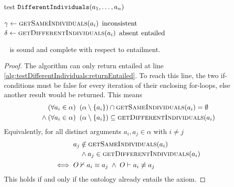 \documentclass[paper.tex]{subfiles}
\begin{document}

\begin{algorithm}[H]
  \caption{test $\mathtt{DifferentIndividuals}(a_1, \ldots, a_n)$}
  \begin{algorithmic}[1]
    \raggedright
        \State $\gamma \gets \Call{getSameIndividuals}{a_i}$
          \State \Return $\mathrm{inconsistent}$
          \label{alg:testDifferentIndividuals:returnInconsistent}
        \EndIf
      \EndFor
        \State $\delta \gets \Call{getDifferentIndividuals}{a_i}$
          \State \Return $\mathrm{absent}$
        \EndIf
      \EndFor
      \State \Return $\mathrm{entailed}$
      \label{alg:testDifferentIndividuals:returnEntailed}
    \EndFunction
  \end{algorithmic}
\end{algorithm}

\begin{proposition}
  \sloppy~
   is sound and complete with respect to entailment.
\end{proposition}
\begin{proof}
  The algorithm can only return entailed at line \ref{alg:testDifferentIndividuals:returnEntailed}.  To reach this line, the two if-conditions must be false for every iteration of their enclosing for-loops, else another result would be returned.  This means
  \begin{align*}
    & (\forall a_i \in \alpha) \;\; (\alpha \setminus \{a_i\}) \intersect \Call{getSameIndividuals}{a_i} = \emptyset \\
    {}\land{}& (\forall a_i \in \alpha) \;\; (\alpha \setminus \{a_i\}) \subseteq \Call{getDifferentIndividuals}{a_i}
  \end{align*}
  Equivalently, for all distinct arguments $a_i, a_j \in \alpha$ with $i \ne j$
  \begin{align*}
    & \begin{multlined}[t]
      a_j \notin \Call{getSameIndividuals}{a_i} \\
      {} \land a_j \in \Call{getDifferentIndividuals}{a_i}
    \end{multlined} \\
    \iff{}& O \nsementails a_i \equiv a_j \;\land\; O \sementails a_i \not\equiv a_j
  \end{align*}
  This holds if and only if the ontology already entails the axiom.
\end{proof}
\end{document}
